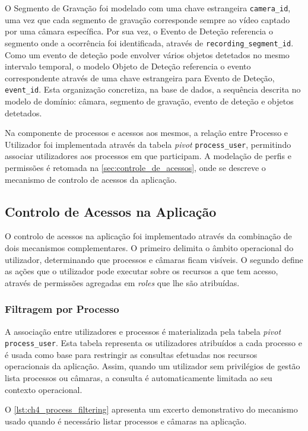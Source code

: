 O Segmento de Gravação foi modelado com uma chave estrangeira \texttt{camera\_id}, uma vez que cada segmento de gravação corresponde sempre ao vídeo captado por uma câmara específica. Por sua vez, o Evento de Deteção referencia o segmento onde a ocorrência foi identificada, através de \texttt{recording\_segment\_id}. Como um evento de deteção pode envolver vários objetos detetados no mesmo intervalo temporal, o modelo Objeto de Deteção referencia o evento correspondente através de uma chave estrangeira para Evento de Deteção, \texttt{event\_id}. Esta organização concretiza, na base de dados, a sequência descrita no modelo de domínio: câmara, segmento de gravação, evento de deteção e objetos detetados. 

Na componente de processos e acessos aos mesmos, a relação entre Processo e Utilizador foi implementada através da tabela \textit{pivot} \texttt{process\_user}, permitindo associar utilizadores aos processos em que participam. A modelação de perfis e permissões é retomada na \autoref{sec:controle_de_acessos}, onde se descreve o mecanismo de controlo de acessos da aplicação.

\subsection{Controlo de Acessos na Aplicação}
\label{sec:controle_de_acessos}

O controlo de acessos na aplicação foi implementado através da combinação de dois mecanismos complementares. O primeiro delimita o âmbito operacional do utilizador, determinando que processos e câmaras ficam visíveis. O segundo define as ações que o utilizador pode executar sobre os recursos a que tem acesso, através de permissões agregadas em \textit{roles} que lhe são atribuídas.

\subsubsection{Filtragem por Processo}

A associação entre utilizadores e processos é materializada pela tabela \textit{pivot} \texttt{process\_user}. Esta tabela representa os utilizadores atribuídos a cada processo e é usada como base para restringir as consultas efetuadas nos recursos operacionais da aplicação. Assim, quando um utilizador sem privilégios de gestão lista processos ou câmaras, a consulta é automaticamente limitada ao seu contexto operacional.

O \autoref{lst:ch4_process_filtering} apresenta um excerto demonstrativo do mecanismo usado quando é necessário listar processos e câmaras na aplicação.

